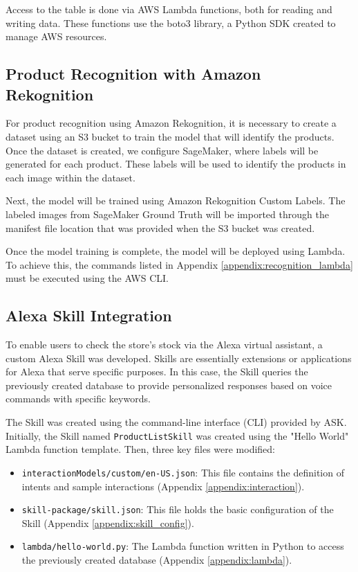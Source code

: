 Access to the table is done via AWS Lambda functions, both for reading and writing data. These functions use the boto3 library, a Python SDK created to manage AWS resources.

\subsection{Product Recognition with Amazon Rekognition}

For product recognition using Amazon Rekognition, it is necessary to create a dataset using an S3 bucket to train the model that will identify the products. Once the dataset is created, we configure SageMaker, where labels will be generated for each product. These labels will be used to identify the products in each image within the dataset.

Next, the model will be trained using Amazon Rekognition Custom Labels. The labeled images from SageMaker Ground Truth will be imported through the manifest file location that was provided when the S3 bucket was created.

Once the model training is complete, the model will be deployed using Lambda. To achieve this, the commands listed in Appendix \ref{appendix:recognition_lambda} must be executed using the AWS CLI.



\subsection{Alexa Skill Integration}

To enable users to check the store's stock via the Alexa virtual assistant, a custom Alexa Skill was developed. Skills are essentially extensions or applications for Alexa that serve specific purposes. In this case, the Skill queries the previously created database to provide personalized responses based on voice commands with specific keywords.

The Skill was created using the command-line interface (CLI) provided by ASK. Initially, the Skill named \texttt{ProductListSkill} was created using the "Hello World" Lambda function template. Then, three key files were modified:

\begin{itemize} 
	\item \texttt{interactionModels/custom/en-US.json}: This file contains the definition of intents and sample interactions (Appendix \ref{appendix:interaction}). 
	\item \texttt{skill-package/skill.json}: This file holds the basic configuration of the Skill (Appendix \ref{appendix:skill_config}).
	\item \texttt{lambda/hello-world.py}: The Lambda function written in Python to access the previously created database (Appendix \ref{appendix:lambda}).
\end{itemize}

